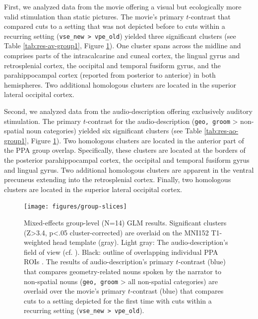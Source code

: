 \documentclass[english]{article}
\begin{document}
First, we analyzed data from the movie offering a visual but ecologically more
valid stimulation than static pictures.
The movie's primary $t$-contrast that compared cuts to a setting that was not
depicted before to cuts within a recurring setting (\texttt{vse\_new >
vpe\_old}) yielded three significant clusters (see Table
\ref{tab:res-av-group1}, Figure \ref{fig:group-slices}).
One cluster spans across the midline and comprises parts of the intracalcarine
and cuneal cortex, the lingual gyrus and retrosplenial cortex, the occipital and
temporal fusiform gyrus, and the parahippocampal cortex (reported from posterior
to anterior) in both hemispheres.
Two additional homologous clusters are located in the superior lateral occipital
cortex.

Second, we analyzed data from the audio-description offering exclusively
auditory stimulation.
The primary $t$-contrast for the audio-description (\texttt{geo, groom} >
non-spatial noun categories) yielded six significant clusters (see Table
\ref{tab:res-ao-group1}, Figure \ref{fig:group-slices}).
Two homologous clusters are located in the anterior part of the PPA group
overlap.
Specifically, these clusters are located at the borders of the posterior
parahippocampal cortex, the occipital and temporal fusiform gyrus and lingual
gyrus.
Two additional homologous clusters are apparent in the ventral precuneus
extending into the retrosplenial cortex.
Finally, two homologous clusters are located in the superior lateral occipital
cortex.

\begin{figure}[h!] \centering
    \texttt{[image: figures/group-slices]}
    \caption{Mixed-effects group-level (N=14) GLM results. Significant clusters
        (Z>3.4, p<.05 cluster-corrected) are overlaid on the MNI152 T1-weighted
        head template (gray).
        Light gray: The audio-description's field of view
        (cf. \citep{hanke2014audiomovie}).
        Black: outline of overlapping individual PPA ROIs
        \citep{sengupta2016extension}.
        The results of audio-description's primary $t$-contrast (blue) that
        compares geometry-related nouns spoken by the narrator to non-spatial
        nouns (\texttt{geo, groom} > all non-spatial
        categories)
        are overlaid over the movie's primary $t$-contrast (blue) that compares
        cuts to a setting depicted for the first time with cuts within a
        recurring setting
        (\texttt{vse\_new > vpe\_old}).
        }
    \label{fig:group-slices}
\end{figure}
\end{document}
